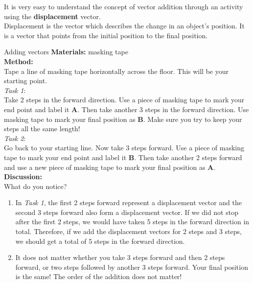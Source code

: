 It is very easy to understand the concept of vector addition through an activity using the \textbf{displacement} vector.  \\
Displacement is the vector which describes the change in an object's position. It is a vector that points from the initial position to the final position. \\

\begin{activity}{Adding vectors}
\textbf{Materials:} masking tape \\
\textbf{Method:} \\
Tape a line of masking tape horizontally across the floor. This will be your starting point. \\
\textit{Task 1}:\\
Take 2 steps in the forward direction. Use a piece of masking tape to mark your end point and label it \textbf{A}. Then take another 3 steps in the forward direction. Use masking tape to mark your final position as \textbf{B}. Make sure you try to keep your steps all the same length! \\
\textit{Task 2}:\\
Go back to your starting line. Now take 3 steps forward. Use a piece of masking tape to mark your end point and label it \textbf{B}. Then take another 2 steps forward and use a new piece of masking tape to mark your final position as \textbf{A}. \\
\textbf{Discussion:}\\
What do you notice?\\
\begin{enumerate}[noitemsep, label=\textbf{\arabic*}.]
\item In \textit{Task 1}, the first 2 steps forward represent a displacement vector and the second 3 steps forward also form a displacement vector. If we did not stop after the first 2 steps, we would have taken 5 steps in the forward direction in total. Therefore, if we add the displacement vectors for 2 steps and 3 steps, we should get a total of 5 steps in the forward direction. 
\item It does not matter whether you take 3 steps forward and then 2 steps forward, or two steps followed by another 3 steps forward. Your final position is the same! The order of the addition does not matter!
\end{enumerate}
\end{activity}

